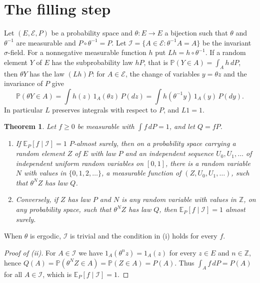 \documentclass[11pt]{amsart}
\newtheorem{theorem}{Theorem}[section]
\theoremstyle{remark}
\numberwithin{equation}{section}
\newcommand{\E}{\mathbb E}
\newcommand{\Pp}{\mathbb P}
\newcommand{\Z}{\mathbb Z}
\newcommand{\I}{\mathcal I}
\begin{document}
\section{The filling step}\label{sec:filling}

Let $(E,\mathcal E,P)$ be a probability space and $\theta:E\to E$ a bijection such that $\theta$ and $\theta^{-1}$ are measurable and $P\circ\theta^{-1}=P$. Let $\I=\{A\in\mathcal E:\theta^{-1}A=A\}$ be the invariant $\sigma$-field. For a nonnegative measurable function $h$ put $Lh=h\circ\theta^{-1}$. If a random element $Y$ of $E$ has the subprobability law $hP$, that is $\Pp(Y\in A)=\int_A h\,dP$, then $\theta Y$ has the law $(Lh)P$: for $A\in\mathcal E$, the change of variables $y=\theta z$ and the invariance of $P$ give
\begin{equation}\label{eq:push}
\Pp(\theta Y\in A)=\int h(z)\,1_A(\theta z)\,P(dz)=\int h(\theta^{-1}y)\,1_A(y)\,P(dy).
\end{equation}
In particular $L$ preserves integrals with respect to $P$, and $L1=1$.

\begin{theorem}\label{thm:filling}
Let $f\ge0$ be measurable with $\int f\,dP=1$, and let $Q=fP$.
\begin{enumerate}[label=\textup{(\roman*)}]
\item If $\E_P[f\mid\I]=1$ $P$-almost surely, then on a probability space carrying a random element $Z$ of $E$ with law $P$ and an independent sequence $U_0,U_1,\dots$ of independent uniform random variables on $[0,1]$, there is a random variable $N$ with values in $\{0,1,2,\dots\}$, a measurable function of $(Z,U_0,U_1,\dots)$, such that $\theta^NZ$ has law $Q$.
\item Conversely, if $Z$ has law $P$ and $N$ is any random variable with values in $\Z$, on any probability space, such that $\theta^NZ$ has law $Q$, then $\E_P[f\mid\I]=1$ almost surely.
\end{enumerate}
\end{theorem}

When $\theta$ is ergodic, $\I$ is trivial and the condition in (i) holds for every $f$.

\begin{proof}[Proof of \textup{(ii)}]
For $A\in\I$ we have $1_A(\theta^nz)=1_A(z)$ for every $z\in E$ and $n\in\Z$, hence $Q(A)=\Pp(\theta^NZ\in A)=\Pp(Z\in A)=P(A)$. Thus $\int_A f\,dP=P(A)$ for all $A\in\I$, which is $\E_P[f\mid\I]=1$.
\end{proof}
\end{document}
